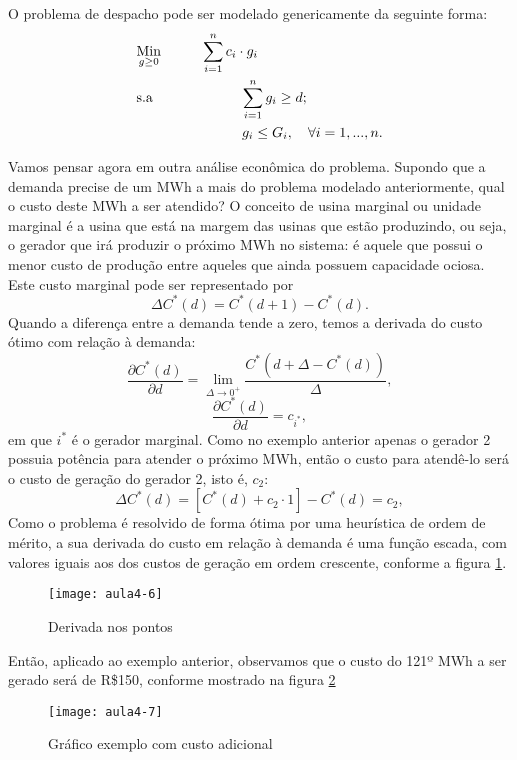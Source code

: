 O problema de despacho pode ser modelado genericamente da seguinte forma:
\begin{align}
    & \underset{g\geq0}{\text{Min}} \hspace{1cm} \sum_{i=1}^{n}c_{i}\cdot g_{i} \label{eq9} \\
    & \text{s.a}  \hspace{2.2cm} \sum_{i=1}^{n}g_{i}\geq d; \label{eq10} \\
    &             \hspace{2.65cm}g_{i}\leq G_{i}, \quad \forall i=1,...,n. \label{eq11}
\end{align}

Vamos pensar agora em outra análise econômica do problema. Supondo que a demanda precise de um MWh a mais do problema modelado anteriormente, qual o custo deste MWh a ser atendido?
O conceito de usina marginal ou unidade marginal é a usina que está na
margem das usinas que estão produzindo, ou seja, o gerador que irá produzir o próximo MWh no sistema: é aquele que possui o menor custo de produção entre aqueles que ainda possuem capacidade ociosa. 
Este custo marginal pode ser representado por
\[
	\Delta C^{*}(d)=C^{*}(d+1)-C^{*}(d).
\]
Quando a diferença entre a demanda tende a zero, temos a derivada do custo ótimo com relação à demanda:
\[
	\frac{\partial C^{*}(d)}{\partial d}=\lim_{\Delta\rightarrow0^{+}}\frac{C^{*}(d+\Delta-C^{*}(d))}{\Delta} ,
\]
\[
	\frac{\partial C^{*}(d)}{\partial d}=c_{i^{*}},
\]
em que $i^{*}$ é o gerador marginal.
Como no exemplo anterior apenas o gerador 2 possuia potência para atender o
próximo MWh, então o custo para atendê-lo será o custo de geração do gerador 2, isto é, $c_{2}$:
\[
\Delta C^{*}(d)=[C^{*}(d)+c_{2}\cdot1]-C^{*}(d)=c_{2},
\]
Como o problema é resolvido de forma ótima por uma heurística de ordem de mérito, a sua derivada do custo em relação à demanda é uma função escada, com valores iguais aos dos custos de geração em ordem crescente, conforme a figura \ref{fig:aula4-6}.
\begin{figure}[H]
\begin{centering}
\texttt{[image: aula4-6]}\protect\caption{\label{fig:aula4-6} Derivada nos pontos}
\end{centering}
\end{figure}
Então, aplicado ao exemplo anterior, observamos que o custo do 121º MWh a ser gerado será de R\$150, conforme mostrado na figura \ref{fig:aula4-7}
\begin{figure}[H]
\begin{centering}
\texttt{[image: aula4-7]}\protect\caption{\label{fig:aula4-7} Gráfico exemplo com custo adicional}
\end{centering}
\end{figure}
